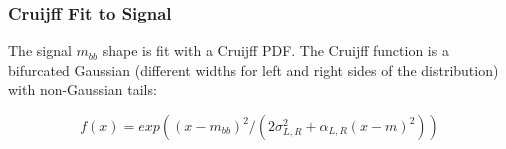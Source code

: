 \subsubsection{Cruijff Fit to Signal}

The signal $m_{bb}$ shape is fit with a Cruijff PDF.  The Cruijff function is a bifurcated Gaussian (different widths for left and right sides of the distribution) with non-Gaussian tails: 

\begin{equation}
f(x) = exp((x-m_{bb})^2 / (2\sigma^2_{L,R} + \alpha_{L,R}(x-m)^2))
\end{equation}



